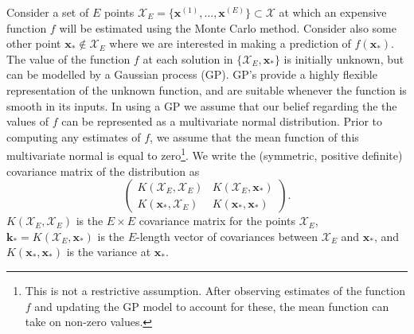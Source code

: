 \documentclass{article} %
\begin{document}


Consider a set of $E$ points $\mathcal{X}_{E} = \{ \textbf{x}^{(1)}, \ldots , \textbf{x}^{(E)} \} \subset \mathcal{X}$ at which an expensive function $f$ will be estimated using the Monte Carlo method. Consider also some other point $\mathbf{x}_{*} \not\in \mathcal{X}_{E}$ where we are interested in making a prediction of $f(\mathbf{x}_{*})$. The value of the function $f$ at each solution in $\{\mathcal{X}_{E}, \mathbf{x}_{*}\}$ is initially unknown, but can be modelled by a Gaussian process (GP). GP's provide a highly flexible representation of the unknown function, and are suitable whenever the function is smooth in its inputs.
In using a GP we assume that our belief regarding the the values of $f$ can be represented as a multivariate normal distribution. Prior to computing any estimates of $f$, we assume that the mean function of this multivariate normal is equal to zero\footnote{This is not a restrictive assumption. After observing estimates of the function $f$ and updating the GP model to account for these, the mean function can take on non-zero values.}.
We write the (symmetric, positive definite) covariance matrix of the distribution as
\begin{equation}\label{eqn:cov_matrix}
\begin{pmatrix}
K(\mathcal{X}_{E}, \mathcal{X}_{E}) & K(\mathcal{X}_{E}, \mathbf{x}_{*}) \\
K(\mathbf{x}_{*}, \mathcal{X}_{E}) & K(\mathbf{x}_{*}, \mathbf{x}_{*})
\end{pmatrix}.
\end{equation}
$K(\mathcal{X}_{E}, \mathcal{X}_{E})$ is the $E \times E$ covariance matrix for the points $\mathcal{X}_{E}$, $\mathbf{k}_{*} = K(\mathcal{X}_{E}, \mathbf{x}_{*})$ is the $E$-length vector of covariances between $\mathcal{X}_{E}$ and $\mathbf{x}_{*}$, and $K(\mathbf{x}_{*}, \mathbf{x}_{*})$ is the variance at $\mathbf{x}_{*}$.
\end{document}
